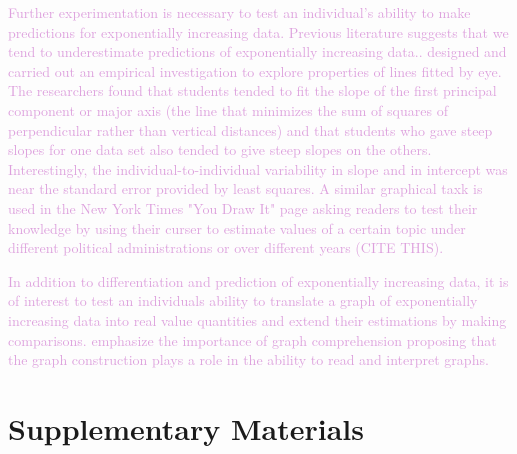 \documentclass[]{interact}
\theoremstyle{plain}%
\theoremstyle{definition}
\theoremstyle{remark}
\begin{document}
\textcolor{Plum}{
Further experimentation is necessary to test an individual's ability to make predictions for exponentially increasing data. 
Previous literature suggests that we tend to underestimate predictions of exponentially increasing data.\citep{jones_generalized_1979, jones_polynomial_1977, wagenaar_extrapolation_1978}.
\citep{mosteller_eye_1981} designed and carried out an empirical investigation to explore properties of lines fitted by eye. 
The researchers found that students tended to fit the slope of the first principal component or major axis (the line that minimizes the sum of squares of perpendicular rather than vertical distances) and that students who gave steep slopes for one data set also tended to give steep slopes on the others. 
Interestingly, the individual-to-individual variability in slope and in intercept was near the standard error provided by least squares.
A similar graphical taxk is used in the New York Times "You Draw It" page asking readers to test their knowledge by using their curser to estimate values of a certain topic under different political administrations or over different years (CITE THIS).
}

\textcolor{Plum}{
In addition to differentiation and prediction of exponentially increasing data, it is of interest to test an individuals ability to translate a graph of exponentially increasing data into real value quantities and extend their estimations by making comparisons. 
\citep{friel_making_2001} emphasize the importance of graph comprehension proposing that the graph construction plays a role in the ability to read and interpret graphs.
}

\hypertarget{supplementary-materials}{%
\section*{Supplementary Materials}\label{supplementary-materials}}



\end{document}
